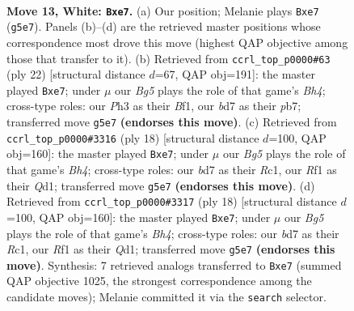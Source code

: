 \documentclass[11pt]{article}
\begin{document}
\begin{figure}[p]\centering
\begin{subfigure}{0.46\textwidth}\centering
\resizebox{\linewidth}{!}{%
\newchessgame
\chessboard[
  setfen={r2qr1k1/1p1bbppp/p1n1p3/2Pp2B1/3Pn3/P1N2N1P/1P2BPP1/R2Q1RK1 w - - 1 13},
  showmover=false,
  pgfstyle=straightmove, color=movearrow, markmove={g5-e7}
]}
\caption{}
\end{subfigure}\hfill
\begin{subfigure}{0.46\textwidth}\centering
\resizebox{\linewidth}{!}{%
\newchessgame
\chessboard[
  setfen={r1bq1rk1/pp2bpp1/2n1p2p/2Pp4/3Pn2B/P1N2N2/1P3PPP/2RQKB1R w K - 1 12},
  showmover=false,
  pgfstyle=straightmove, color=movearrow, markmove={h4-e7}
]}
\caption{}
\end{subfigure}
\\[4pt]
\begin{subfigure}{0.46\textwidth}\centering
\resizebox{\linewidth}{!}{%
\newchessgame
\chessboard[
  setfen={r1bq1rk1/pp1nbpp1/2p1p2p/3p4/2PPn2B/P1N1PN2/1P3PPP/2RQKB1R w K - 2 10},
  showmover=false,
  pgfstyle=straightmove, color=movearrow, markmove={h4-e7}
]}
\caption{}
\end{subfigure}\hfill
\begin{subfigure}{0.46\textwidth}\centering
\resizebox{\linewidth}{!}{%
\newchessgame
\chessboard[
  setfen={r1bq1rk1/pp1nbpp1/2p1p2p/3p4/2PPn2B/P1N1PN2/1P3PPP/2RQKB1R w K - 2 10},
  showmover=false,
  pgfstyle=straightmove, color=movearrow, markmove={h4-e7}
]}
\caption{}
\end{subfigure}
\caption{\textbf{Move 13, White: \texttt{Bxe7}.} (a) Our position; Melanie plays \texttt{Bxe7} (\texttt{g5e7}). Panels (b)--(d) are the retrieved master positions whose correspondence most drove this move (highest QAP objective among those that transfer to it). (b) Retrieved from \texttt{ccrl\_top\_p0000\#63} (ply 22) [structural distance $d$=67, QAP obj=191]: the master played \texttt{Bxe7}; under $\mu$ our \emph{Bg5} plays the role of that game's \emph{Bh4}; cross-type roles: our \emph{P}h3 as their \emph{B}f1, our \emph{b}d7 as their \emph{p}b7; transferred move \texttt{g5e7} \textbf{(endorses this move)}. (c) Retrieved from \texttt{ccrl\_top\_p0000\#3316} (ply 18) [structural distance $d$=100, QAP obj=160]: the master played \texttt{Bxe7}; under $\mu$ our \emph{Bg5} plays the role of that game's \emph{Bh4}; cross-type roles: our \emph{b}d7 as their \emph{R}c1, our \emph{R}f1 as their \emph{Q}d1; transferred move \texttt{g5e7} \textbf{(endorses this move)}. (d) Retrieved from \texttt{ccrl\_top\_p0000\#3317} (ply 18) [structural distance $d$=100, QAP obj=160]: the master played \texttt{Bxe7}; under $\mu$ our \emph{Bg5} plays the role of that game's \emph{Bh4}; cross-type roles: our \emph{b}d7 as their \emph{R}c1, our \emph{R}f1 as their \emph{Q}d1; transferred move \texttt{g5e7} \textbf{(endorses this move)}. Synthesis: 7 retrieved analogs transferred to \texttt{Bxe7} (summed QAP objective 1025, the strongest correspondence among the candidate moves); Melanie committed it via the \texttt{search} selector.}
\label{fig:thought-m24}
\end{figure}
\end{document}
